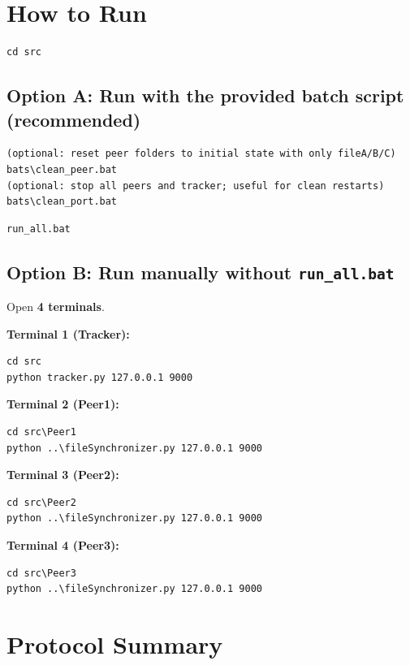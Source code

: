 \documentclass[11pt]{article}
\begin{document}
\section{How to Run}
\begin{lstlisting}
cd src
\end{lstlisting}


\subsection*{Option A: Run with the provided batch script (recommended)}
\begin{lstlisting}
(optional: reset peer folders to initial state with only fileA/B/C)
bats\clean_peer.bat
(optional: stop all peers and tracker; useful for clean restarts)
bats\clean_port.bat

\end{lstlisting}

\begin{lstlisting}
run_all.bat
\end{lstlisting}

\subsection*{Option B: Run manually without \texttt{run\_all.bat}}
Open \textbf{4 terminals}.

\textbf{Terminal 1 (Tracker):}
\begin{lstlisting}
cd src
python tracker.py 127.0.0.1 9000
\end{lstlisting}

\textbf{Terminal 2 (Peer1):}
\begin{lstlisting}
cd src\Peer1
python ..\fileSynchronizer.py 127.0.0.1 9000
\end{lstlisting}

\textbf{Terminal 3 (Peer2):}
\begin{lstlisting}
cd src\Peer2
python ..\fileSynchronizer.py 127.0.0.1 9000
\end{lstlisting}

\textbf{Terminal 4 (Peer3):}
\begin{lstlisting}
cd src\Peer3
python ..\fileSynchronizer.py 127.0.0.1 9000
\end{lstlisting}


\section{Protocol Summary}
\end{document}
